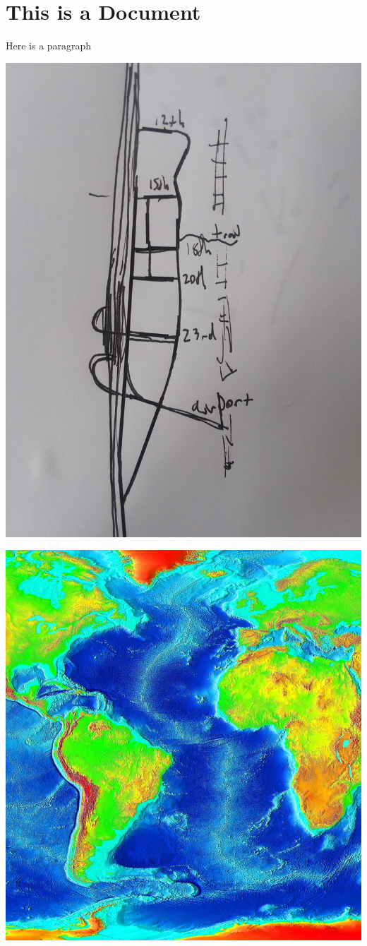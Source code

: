 \documentclass[11pt]{article}
\begin{document}
\section{This is a Document}


Here is a paragraph





\includegraphics[width=\linewidth]{scroll_images/image0.jpg}





\includegraphics[width=\linewidth]{scroll_images/image1.jpg}
\end{document}
